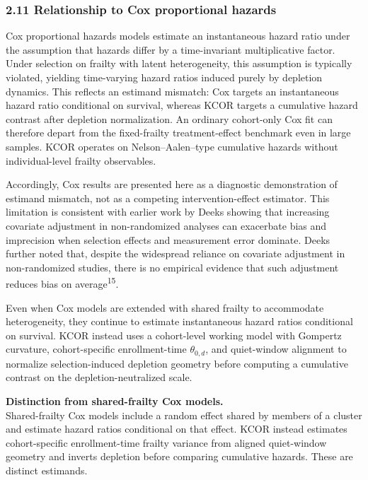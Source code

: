 \documentclass[
]{article}
\begin{document}
\subsubsection{2.11 Relationship to Cox proportional hazards}\label{relationship-to-cox-proportional-hazards}

Cox proportional hazards models estimate an instantaneous hazard ratio under the assumption that hazards differ by a time-invariant multiplicative factor. Under selection on frailty with latent heterogeneity, this assumption is typically violated, yielding time-varying hazard ratios induced purely by depletion dynamics. This reflects an estimand mismatch: Cox targets an instantaneous hazard ratio conditional on survival, whereas KCOR targets a cumulative hazard contrast after depletion normalization. An ordinary cohort-only Cox fit can therefore depart from the fixed-frailty treatment-effect benchmark even in large samples. KCOR operates on Nelson--Aalen--type cumulative hazards without individual-level frailty observables.

Accordingly, Cox results are presented here as a diagnostic demonstration of estimand mismatch, not as a competing intervention-effect estimator. This limitation is consistent with earlier work by Deeks showing that increasing covariate adjustment in non-randomized analyses can exacerbate bias and imprecision when selection effects and measurement error dominate. Deeks further noted that, despite the widespread reliance on covariate adjustment in non-randomized studies, there is no empirical evidence that such adjustment reduces bias on average\textsuperscript{15}.

Even when Cox models are extended with shared frailty to accommodate heterogeneity, they continue to estimate instantaneous hazard ratios conditional on survival. KCOR instead uses a cohort-level working model with Gompertz curvature, cohort-specific enrollment-time \(\theta_{0,d}\), and quiet-window alignment to normalize selection-induced depletion geometry before computing a cumulative contrast on the depletion-neutralized scale.

\textbf{Distinction from shared-frailty Cox models.}\\
Shared-frailty Cox models include a random effect shared by members of a cluster and estimate hazard ratios conditional on that effect. KCOR instead estimates cohort-specific enrollment-time frailty variance from aligned quiet-window geometry and inverts depletion before comparing cumulative hazards. These are distinct estimands.
\end{document}
